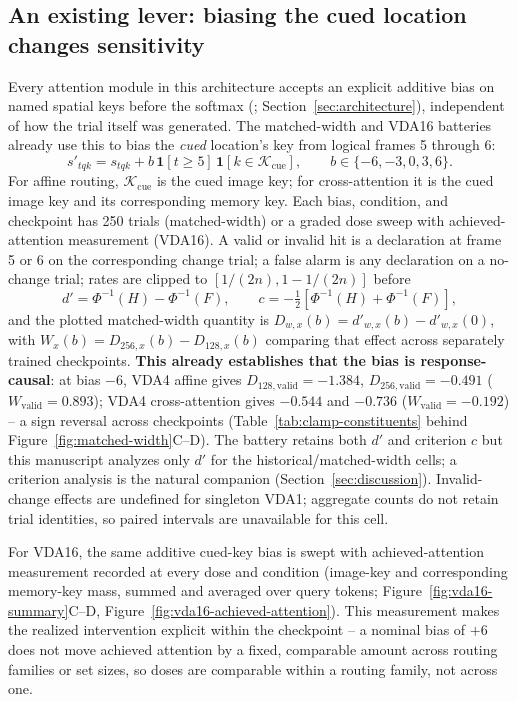 \documentclass[11pt,a4paper]{article}
\begin{document}
\subsection{An existing lever: biasing the cued location changes sensitivity}\label{sec:existing-intervention}
Every attention module in this architecture accepts an explicit additive bias on named spatial keys before the softmax (; Section~\ref{sec:architecture}), independent of how the trial itself was generated. The matched-width and VDA16 batteries already use this to bias the \emph{cued} location's key from logical frames 5 through 6:
\begin{equation}
s'_{tqk}=s_{tqk}+b\,\mathbf{1}[t\geq5]\,\mathbf{1}[k\in\mathcal{K}_{\mathrm{cue}}], \qquad b\in\{-6,-3,0,3,6\}.
\end{equation}
For affine routing, $\mathcal{K}_{\mathrm{cue}}$ is the cued image key; for cross-attention it is the cued image key and its corresponding memory key. Each bias, condition, and checkpoint has 250 trials (matched-width) or a graded dose sweep with achieved-attention measurement (VDA16). A valid or invalid hit is a declaration at frame 5 or 6 on the corresponding change trial; a false alarm is any declaration on a no-change trial; rates are clipped to $[1/(2n),1-1/(2n)]$ before
\begin{equation}
d'=\Phi^{-1}(H)-\Phi^{-1}(F), \qquad c=-\tfrac12\left[\Phi^{-1}(H)+\Phi^{-1}(F)\right],
\end{equation}
and the plotted matched-width quantity is $D_{w,x}(b)=d'_{w,x}(b)-d'_{w,x}(0)$, with $W_x(b)=D_{256,x}(b)-D_{128,x}(b)$ comparing that effect across separately trained checkpoints. \textbf{This already establishes that the bias is response-causal}: at bias $-6$, VDA4 affine gives $D_{128,\mathrm{valid}}=-1.384$, $D_{256,\mathrm{valid}}=-0.491$ ($W_\mathrm{valid}=0.893$); VDA4 cross-attention gives $-0.544$ and $-0.736$ ($W_\mathrm{valid}=-0.192$) -- a sign reversal across checkpoints (Table~\ref{tab:clamp-constituents} behind Figure~\ref{fig:matched-width}C--D). The battery retains both $d'$ and criterion $c$ but this manuscript analyzes only $d'$ for the historical/matched-width cells; a criterion analysis is the natural companion (Section~\ref{sec:discussion}). Invalid-change effects are undefined for singleton VDA1; aggregate counts do not retain trial identities, so paired intervals are unavailable for this cell.

For VDA16, the same additive cued-key bias is swept with achieved-attention measurement recorded at every dose and condition (image-key and corresponding memory-key mass, summed and averaged over query tokens; Figure~\ref{fig:vda16-summary}C--D, Figure~\ref{fig:vda16-achieved-attention}). This measurement makes the realized intervention explicit within the checkpoint -- a nominal bias of $+6$ does not move achieved attention by a fixed, comparable amount across routing families or set sizes, so doses are comparable within a routing family, not across one.
\end{document}
